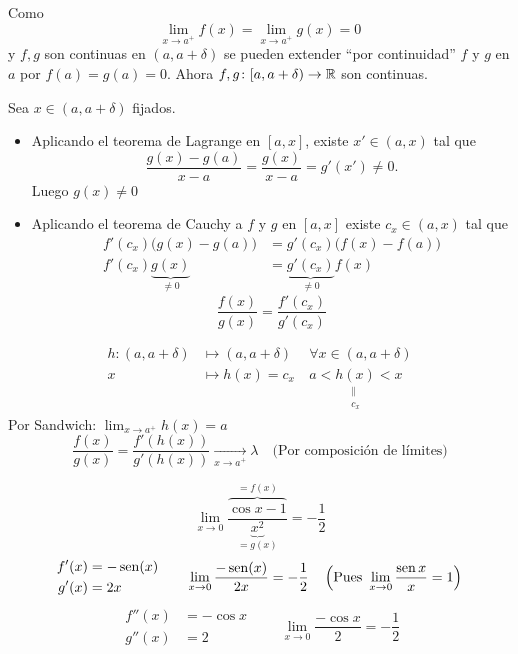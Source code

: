 \documentclass[11pt,a4paper]{article}
\begin{document}
\begin{demo}
  Como
  \[
    \lim_{x\to a^+}f(x)=\lim_{x\to a^+}g(x)=0
  \]
  y $f,g$ son continuas en $(a,a+\delta)$ se pueden extender ``por
  continuidad'' $f$ y $g$ en $a$ por $f(a)=g(a)=0$. Ahora
  $f,g\colon[a,a+\delta)\to\mathbb{R}$ son continuas.

  Sea $x\in(a,a+\delta)$ fijados.
  \begin{itemize}
    \item Aplicando el teorema de Lagrange en $[a,x]$, existe
      $x'\in(a,x)$ tal que
      \[
        \frac{g(x)-g(a)}{x-a}=\frac{g(x)}{x-a}=g'(x')\neq 0.
      \]
      Luego $g(x)\neq 0$
    \item Aplicando el teorema de Cauchy a $f$ y $g$ en $[a,x]$ existe
      $c_x\in(a,x)$ tal que
      \begin{align*}
        f'(c_x)\bigl(g(x)-g(a)\bigr)&=g'(c_x)\bigl(f(x)-f(a)\bigr)\\
        f'(c_x)\underbrace{g(x)}_{\neq 0}&=\underbrace{g'(c_x)}_{\neq 0}f(x)
      \end{align*}
      \[
        \frac{f(x)}{g(x)}=\frac{f'(c_x)}{g'(c_x)}
      \]
  \end{itemize}
  \[
    \begin{array}{rl|l}
      h\colon(a,a+\delta) & \longmapsto(a,a+\delta) &
        \ \forall x\in(a,a+\delta)\\
      x & \longmapsto h(x)=c_x &
        \ a<\underset{\substack{\|\\ c_x}}{h(x)}<x
    \end{array}
  \]
  Por Sandwich: $\displaystyle\lim_{x\to a^+}h(x)=a$
  \[
    \frac{f(x)}{g(x)}=\frac{f'(h(x))}{g'(h(x))}
    \xrightarrow[x\to a^+]{}\lambda
    \quad\text{(Por composición de límites)}
  \]
\end{demo}

\begin{ejemplo}
  \[
    \lim_{x\to 0}\frac{\overbrace{\cos x-1}^{=f(x)}}{\underbrace{x^2}_{=g(x)}}
    =-\frac12
  \]
  \[
    \begin{aligned}
      f'(x)&=-\operatorname{sen}(x)\\
      g'(x)&=2x
    \end{aligned}
    \qquad
    \lim_{x\to 0}\frac{-\operatorname{sen}(x)}{2x}=-\frac12
    \quad\left(\text{Pues }\lim_{x\to 0}\frac{\operatorname{sen} x}{x}=1\right)
  \]
  \[
    \begin{aligned}
      f''(x)&=-\cos x\\
      g''(x)&=2
    \end{aligned}
    \qquad
    \lim_{x\to 0}\frac{-\cos x}{2}=-\frac12
  \]
\end{ejemplo}
\end{document}
